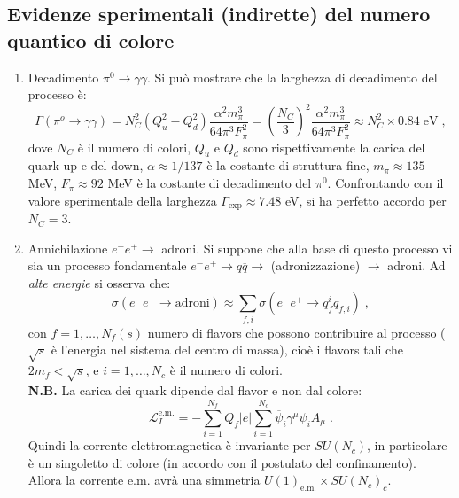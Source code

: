\documentclass[12pt,a4paper]{article}
\theoremstyle{definition}
\newcommand{\lag}{\mathcal{L}}
\numberwithin{equation}{section}
\begin{document}
\subsection{Evidenze sperimentali (indirette) del numero quantico di colore}
\begin{enumerate}
\item Decadimento $\pi^0\to \gamma\gamma$. Si può mostrare che la larghezza di decadimento del processo è:
\begin{equation}
\Gamma(\pi^o\to\gamma\gamma)=N_C^2(Q_u^2-Q_d^2)\frac{\alpha^2m_{\pi}^3}{64\pi^3F_{\pi}^2}=\left(\frac{N_C}{3}\right)^2\frac{\alpha^2m_{\pi}^3}{64\pi^3F_{\pi}^2}\approx N_C^2\times 0.84\;\mathrm{eV}\;,
\end{equation}
dove $N_C$ è il numero di colori, $Q_u$ e $Q_d$ sono rispettivamente la carica del quark up e del down, $\alpha\approx 1/137$ è la costante di struttura fine, $m_{\pi}\approx 135$ MeV, $F_{\pi}\approx 92$ MeV è la costante di decadimento del $\pi^0$. Confrontando con il valore sperimentale della larghezza $\Gamma_{\mathrm{exp}}\approx 7.48$ eV, si ha perfetto accordo per $N_C=3$.
\item Annichilazione $e^-e^+\to$ adroni. Si suppone che alla base di questo processo vi sia un processo fondamentale $e^-e^+\to q\overline{q}\to$ (adronizzazione) $\to$ adroni. Ad \emph{alte energie} si osserva che:
\begin{equation}
\sigma(e^-e^+\to\mbox{adroni})\approx \sum_{f,i}\sigma(e^-e^+\to \overline{q}_f^i\overline{q}_{f,i})\;,
\end{equation}
con $f=1,\ldots, N_f(s)$ numero di flavors che possono contribuire al processo ($\sqrt{s}$ è l'energia nel sistema del centro di massa), cioè i flavors tali che $2m_f<\sqrt{s}$, e $i=1,\ldots,N_c$ è il numero di colori. \\
\textbf{N.B.} La carica dei quark dipende dal flavor e non dal colore:
$$
\lag_{I}^{\mathrm{e.m.}}=-\sum_{i=1}^{N_f}Q_f|e|\sum_{i=1}^{N_c}\overline{\psi}_i\gamma^{\mu}\psi_iA_{\mu}\;.
$$
Quindi la corrente elettromagnetica è invariante per $SU(N_c)$, in particolare è un singoletto di colore (in accordo con il postulato del confinamento). Allora la corrente e.m. avrà una simmetria $U(1)_{\mathrm{e.m.}}\times SU(N_c)_c$. \\


\end{enumerate}
\end{document}
